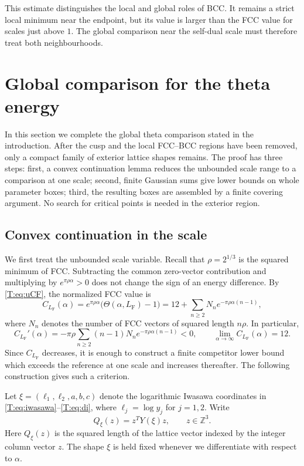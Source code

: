 \documentclass[reqno,english]{amsart}
\theoremstyle{definition}
\newtheorem{open problem}[theorem]{Open Problem}
\theoremstyle{remark}
\theoremstyle{plain}
\numberwithin{equation}{section}
\newcommand{\Z}{\mathbb Z}
\newcommand{\FCC}{L_{\mathrm F}}
\newcommand{\Th}{\Theta}
\begin{document}
This estimate distinguishes the local and global roles of BCC.
It remains a strict local minimum near the endpoint, but its value is
larger than the FCC value for scales just above $1$. The global
comparison near the self-dual scale must therefore treat both
neighbourhoods.

\section{Global comparison for the theta energy}\label{sec:theta-global}

In this section we complete the global theta comparison stated in the introduction. After the cusp and the local FCC--BCC regions have been removed, only a compact family of exterior lattice shapes remains. The proof has three steps: first, a convex continuation lemma reduces the unbounded scale range to a comparison at one scale; second, finite Gaussian sums give lower bounds on whole parameter boxes; third, the resulting boxes are assembled by a finite covering argument. No search for critical points is needed in the exterior region.

\subsection{Convex continuation in the scale}\label{T:sec:continuation}
We first treat the unbounded scale variable. Recall that
$\rho=2^{1/3}$ is the squared minimum of FCC. Subtracting the common
zero-vector contribution and multiplying by $e^{\pi\rho\alpha}>0$
does not change the sign of an energy difference. By
\eqref{T:eq:uCF}, the normalized FCC value is
\[
 C_{\FCC}(\alpha)
 =e^{\pi\rho\alpha}\bigl(\Th(\alpha,\FCC)-1\bigr)
 =12+\sum_{n\ge2}N_n e^{-\pi\rho\alpha(n-1)},
\]
where $N_n$ denotes the number of FCC vectors of squared length $n\rho$.
In particular,
\[
 C_{\FCC}'(\alpha)
 =-\pi\rho\sum_{n\ge2}(n-1)N_n
       e^{-\pi\rho\alpha(n-1)}<0,
 \qquad
 \lim_{\alpha\to\infty}C_{\FCC}(\alpha)=12.
\]
Since $C_{\FCC}$ decreases, it is enough to construct a finite
competitor lower bound which exceeds the reference at one scale and
increases thereafter. The following construction gives such a criterion.

Let $\xi=(\ell_1,\ell_2,a,b,c)$ denote the logarithmic Iwasawa
coordinates in \eqref{T:eq:iwasawa}--\eqref{T:eq:di}, where
$\ell_j=\log y_j$ for $j=1,2$. Write
\[
 Q_\xi(z)=z^TY(\xi)z,
 \qquad z\in\Z^3.
\]
Here $Q_\xi(z)$ is the squared length of the lattice vector indexed by
the integer column vector $z$. The shape $\xi$ is held fixed whenever
we differentiate with respect to $\alpha$.
\end{document}

